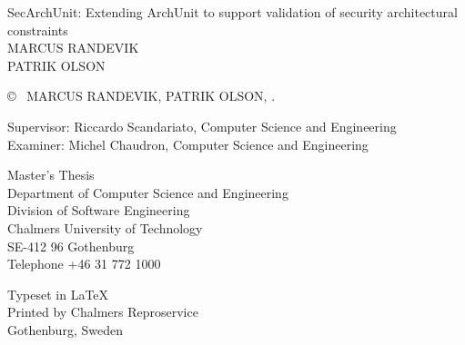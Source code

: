 \newpage
\thispagestyle{plain}
\vspace*{4.5cm}
SecArchUnit: Extending ArchUnit to support validation of security architectural constraints\\
MARCUS RANDEVIK\\
PATRIK OLSON \setlength{\parskip}{1cm}

\copyright ~ MARCUS RANDEVIK, PATRIK OLSON, \the\year. \setlength{\parskip}{1cm}

Supervisor: Riccardo Scandariato, Computer Science and Engineering\\
Examiner: Michel Chaudron, Computer Science and Engineering \setlength{\parskip}{1cm}

Master's Thesis \the\year\\	%
Department of Computer Science and Engineering\\
Division of Software Engineering\\
Chalmers University of Technology\\
SE-412 96 Gothenburg\\
Telephone +46 31 772 1000 \setlength{\parskip}{0.5cm}

\vfill

Typeset in \LaTeX \tagtemp\\
Printed by Chalmers Reproservice\\
Gothenburg, Sweden \the\year

